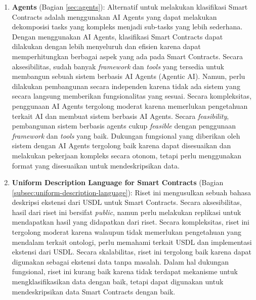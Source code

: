 \begin{enumerate}
    \item \textbf{Agents} (Bagian \ref{sec:agents}): Alternatif untuk melakukan klasifikasi Smart Contracts adalah menggunakan AI Agents yang dapat melakukan dekomposisi tasks yang kompleks menjadi sub-tasks yang lebih sederhana. Dengan menggunakan AI Agents, klasifikasi Smart Contracts dapat dilakukan dengan lebih menyeluruh dan efisien karena dapat memperhitungkan berbagai aspek yang ada pada Smart Contracts. Secara aksesibilitas, sudah banyak \textit{framework} dan \textit{tools} yang tersedia untuk membangun sebuah sistem berbasis AI Agents (Agentic AI). Namun, perlu dilakukan pembangunan secara independen karena tidak ada sistem yang secara langsung memberikan fungsionalitas yang sesuai. Secara kompleksitas, penggunaan AI Agents tergolong moderat karena memerlukan pengetahuan terkait AI dan membuat sistem berbasis AI Agents. Secara \textit{feasibility}, pembangunan sistem berbasis agents cukup \textit{feasible} dengan penggunaan \textit{framework} dan \textit{tools} yang baik. Dukungan fungsional yang diberikan oleh sistem dengan AI Agents tergolong baik karena dapat disesuaikan dan melakukan pekerjaan kompleks secara otonom, tetapi perlu menggunakan format yang disesuaikan untuk mendeskripsikan data.

    \item \textbf{Uniform Description Language for Smart Contracts} \parencite{udlsc} (Bagian \ref{subsec:uniform-description-language}): Riset ini mengusulkan sebuah bahasa deskripsi ekstensi dari USDL untuk Smart Contracts. Secara aksesibilitas, hasil dari riset ini bersifat \textit{public}, namun perlu melakukan replikasi untuk mendapatkan hasil yang didapatkan dari riset. Secara kompleksitas, riset ini tergolong moderat karena walaupun tidak memerlukan pengetahuan yang mendalam terkait ontologi, perlu memahami terkait USDL dan implementasi ekstensi dari USDL. Secara skalabilitas, riset ini tergolong baik karena dapat digunakan sebagai ekstensi data tanpa masalah. Dalam hal dukungan fungsional, riset ini kurang baik karena tidak terdapat mekanisme untuk mengklasifikasikan data dengan baik, tetapi dapat digunakan untuk mendeskripsikan data Smart Contracts dengan baik.
    

\end{enumerate}
